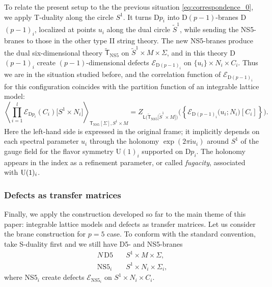 To relate the present setup to the the previous situation \eqref{eq:correspondence_0},
we apply T-duality along the circle $S^{1}$. It turns D$p_{i}$
into D$(p-1)$-branes D$(p-1)_{i}$, localized
at points $u_{i}$ along the dual circle $\tilde{S}^{1}$, while sending
the NS5-branes to those in the other type II string theory. The new
NS5-branes produce the dual six-dimensional theory $\tilde{\mathsf{T}}_{\mathrm{NS5}}$
on $\tilde{S}^{1}\times M\times\Sigma$, and in this theory D$(p-1)_{i}$
create $(p-1)$-dimensional defects $\mathcal{E}_{\mathrm{D}(p-1)_{i}}$
on $\{ u_{i}\} \times N_{i}\times C_{i}$. Thus we are
in the situation studied before, and the correlation function of $\mathcal{E}_{\mathrm{D}(p-1)_{i}}$
for this configuration coincides with the partition function
of an integrable lattice model:
\begin{equation}
  \left\langle
    \prod_{i=1}^l \mathcal{E}_{\mathrm{D}p_i}(C_i) \big[S^1 \times N_i\big]
      \right\rangle_{\mathsf{T}_{\mathrm{NS5}}[\Sigma],S^{1}\times M}
    =
      Z_{\mathsf{L}\big(\tilde{\mathsf{T}}_{\mathrm{NS5}}\big[\tilde{S}^{1}\times M\big]\big)}
      \big( \left\{ \mathcal{E}_{\mathrm{D}(p-1)_i} \big(u_i; N_i\big) [C_i]\right\} \big).
\end{equation}
Here the left-hand side is expressed in the original frame; it implicitly
depends on each spectral parameter $u_{i}$ through the holonomy $\exp(2\pi\mathrm{i}u_{i})$
around $S^{1}$ of the gauge field for the flavor symmetry U$(1)_{i}$
supported on D$p_{i}$. The holonomy appears in the index as a refinement
parameter, or called \emph{fugacity}, associated with $\mathrm{U}(1)_i$.





\subsubsection{Defects as transfer matrices}
\label{sec:defects}

Finally, we apply the construction developed so far
to the main theme of this paper: integrable lattice models and defects
as transfer matrices. Let us consider the brane construction for $p=5$ case.
To conform with the standard convention, take
S-duality first and we still have D5- and NS5-branes
\begin{align*}
  N  \,  \mathrm{D5}   &  \quad S^{1}  \times  M  \times  \Sigma,  \\
  \mathrm{NS5}_{i}    &  \quad S^{1}  \times  N_{i}  \times  \Sigma_{i},
\end{align*}
where NS$5_{i}$ create defects $\mathcal{E}_{\mathrm{NS}5_{i}}$
on $S^{1}\times N_{i}\times C_{i}$.


